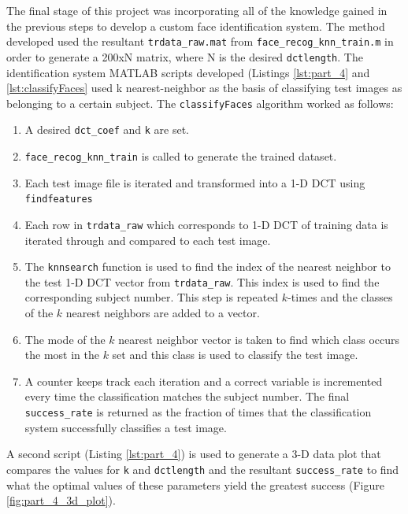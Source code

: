 \documentclass[conference]{IEEEtran}
\begin{document}
The final stage of this project was incorporating all of the knowledge gained in
the previous steps to develop a custom face identification system. The method
developed used the resultant \texttt{trdata\_raw.mat} from
\texttt{face\_recog\_knn\_train.m} in order to generate a 200xN matrix, where N
is the desired \texttt{dctlength}. The identification system
MATLAB\texttrademark{} scripts developed (Listings \ref{lst:part_4} and
\ref{lst:classifyFaces} used k nearest-neighbor as the basis of classifying
test images as belonging to a certain subject. The \texttt{classifyFaces}
algorithm worked as follows:
\begin{enumerate}
    \item
        A desired \texttt{dct\_coef} and \texttt{k} are set.
    \item
        \texttt{face\_recog\_knn\_train} is called to generate the trained
        dataset.
    \item
        Each test image file is iterated and transformed into a 1-D DCT using
        \texttt{findfeatures}
    \item
        Each row in \texttt{trdata\_raw} which corresponds to 1-D DCT of
        training data is iterated through and compared to each test image.
    \item
        The \texttt{knnsearch} function is used to find the index of the nearest
        neighbor to the test 1-D DCT vector from \texttt{trdata\_raw}. This
        index is used to find the corresponding subject number. This step
        is repeated $k$-times and the classes of the $k$ nearest neighbors are added to a
        vector.
    \item
        The mode of the $k$ nearest neighbor vector is taken to find which class
        occurs the most in the $k$ set and this class is used to classify the
        test image.
    \item
        A counter keeps track each iteration and a correct variable is
        incremented every time the classification matches the subject number.
        The final \texttt{success\_rate} is returned as the fraction of times
        that the classification system successfully classifies a test image.
\end{enumerate}

A second script (Listing \ref{lst:part_4}) is used to generate a 3-D data plot
that compares the values for \texttt{k} and \texttt{dctlength} and the resultant
\texttt{success\_rate} to find what the optimal values of these parameters yield
the greatest success (Figure \ref{fig:part_4_3d_plot}).
\end{document}
